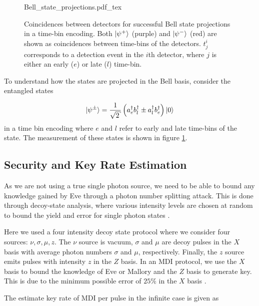 \begin{figure}[tp]
	\centering
	\huge
	\def\svgwidth{0.8\textwidth} 
	{Bell_state_projections.pdf_tex}
	\caption[Bell state projections for time-bin encoding]{Coincidences between detectors for successful Bell state projections in a time-bin encoding. Both $\ket{\psi^+}$ (purple) and $\ket{\psi^-}$ (red) are shown as coincidences between time-bins of the detectors. $t^i_j$ corresponds to a detection event in the $i$th detector, where $j$ is either an early ($e$) or late ($l$) time-bin. }
	\label{fig:bell_state_projections}
\end{figure}

To understand how the states are projected in the Bell basis, consider the entangled states

\begin{equation}
	\ket{\psi^\pm} = \frac{1}{\sqrt{2}}\left(a^\dagger_e b^\dagger_l \pm a^\dagger_l b^\dagger_e\right)\ket{0}
\end{equation}
in a time bin encoding where $e$ and $l$ refer to early and late time-bins of the state. The measurement of these states is shown in figure \ref{fig:bell_state_projections}.

\subsection{Security and Key Rate Estimation}

As we are not using a true single photon source, we need to be able to bound any knowledge gained by Eve through a photon number splitting attack. This is done through decoy-state analysis, where various intensity levels are chosen at random to bound the yield and error for single photon states \cite{Lo2005}. 

Here we used a four intensity decoy state protocol where we consider four sources: $\nu, \sigma, \mu, z$. The $\nu$ source is vacuum, $\sigma$ and $\mu$ are decoy pulses in the $X$ basis with average photon numbers $\sigma$ and $\mu$, respectively. Finally, the $z$ source emits pulses with intensity $z$ in the $Z$ basis. In an \ac{MDI} protocol, we use the $X$ basis to bound the knowledge of Eve or Mallory and the $Z$ basis to generate key. This is due to the minimum possible error of $25\%$ in the $X$ basis \cite{Rubenok2013}.

The estimate key rate of \ac{MDI} per pulse in the infinite case is given as

